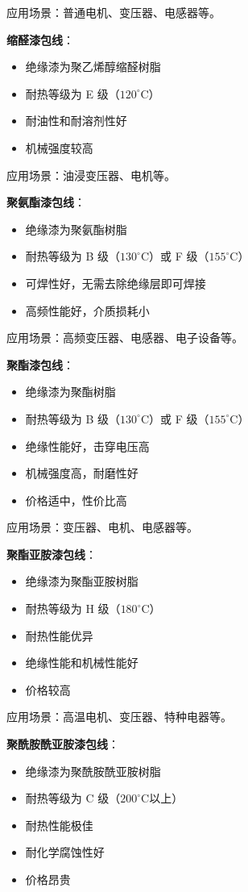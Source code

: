 \documentclass[12pt,UTF8]{ctexbook}
\begin{document}
应用场景：普通电机、变压器、电感器等。

\textbf{缩醛漆包线}：
\begin{itemize}[leftmargin=3.5em]
    \item 绝缘漆为聚乙烯醇缩醛树脂
    \item 耐热等级为 E 级（$120^\circ$C）
    \item 耐油性和耐溶剂性好
    \item 机械强度较高
\end{itemize}

应用场景：油浸变压器、电机等。

\textbf{聚氨酯漆包线}：
\begin{itemize}[leftmargin=3.5em]
    \item 绝缘漆为聚氨酯树脂
    \item 耐热等级为 B 级（$130^\circ$C）或 F 级（$155^\circ$C）
    \item 可焊性好，无需去除绝缘层即可焊接
    \item 高频性能好，介质损耗小
\end{itemize}

应用场景：高频变压器、电感器、电子设备等。

\textbf{聚酯漆包线}：
\begin{itemize}[leftmargin=3.5em]
    \item 绝缘漆为聚酯树脂
    \item 耐热等级为 B 级（$130^\circ$C）或 F 级（$155^\circ$C）
    \item 绝缘性能好，击穿电压高
    \item 机械强度高，耐磨性好
    \item 价格适中，性价比高
\end{itemize}

应用场景：变压器、电机、电感器等。

\textbf{聚酯亚胺漆包线}：
\begin{itemize}[leftmargin=3.5em]
    \item 绝缘漆为聚酯亚胺树脂
    \item 耐热等级为 H 级（$180^\circ$C）
    \item 耐热性能优异
    \item 绝缘性能和机械性能好
    \item 价格较高
\end{itemize}

应用场景：高温电机、变压器、特种电器等。

\textbf{聚酰胺酰亚胺漆包线}：
\begin{itemize}[leftmargin=3.5em]
    \item 绝缘漆为聚酰胺酰亚胺树脂
    \item 耐热等级为 C 级（$200^\circ$C以上）
    \item 耐热性能极佳
    \item 耐化学腐蚀性好
    \item 价格昂贵
\end{itemize}
\end{document}
